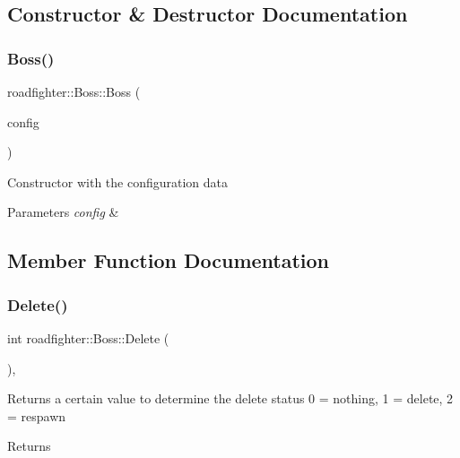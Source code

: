\subsection{Constructor \& Destructor Documentation}
\mbox{\label{classroadfighter_1_1Boss_ae71359243be30ff532283b15be66bb70}} 
\subsubsection{\texorpdfstring{Boss()}{Boss()}}
{\footnotesize\ttfamily roadfighter\+::\+Boss\+::\+Boss (\begin{DoxyParamCaption}\item[{std\+::shared\+\_\+ptr$<$ \hyperlink{classConfigData}{Config\+Data} $>$}]{config }\end{DoxyParamCaption})}

Constructor with the configuration data 
\begin{DoxyParams}{Parameters}
{\em config} & \\
\hline
\end{DoxyParams}


\subsection{Member Function Documentation}
\mbox{\label{classroadfighter_1_1Boss_a8ffadaa85b61447da023c043d3d2dcc9}} 
\subsubsection{\texorpdfstring{Delete()}{Delete()}}
{\footnotesize\ttfamily int roadfighter\+::\+Boss\+::\+Delete (\begin{DoxyParamCaption}{ }\end{DoxyParamCaption})\hspace{0.3cm}{\ttfamily [override]}, {\ttfamily [virtual]}}

Returns a certain value to determine the delete status 0 = nothing, 1 = delete, 2 = respawn \begin{DoxyReturn}{Returns}

\end{DoxyReturn}


